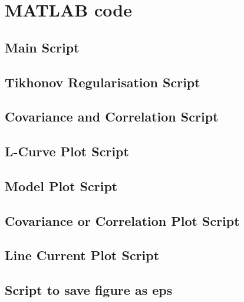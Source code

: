 \appendix
\section{MATLAB code}
\subsection{Main Script}


\clearpage
\subsection{Tikhonov Regularisation Script}


\subsection{Covariance and Correlation Script}


\subsection{L-Curve Plot Script}


\subsection{Model Plot Script}


\subsection{Covariance or Correlation Plot Script}


\clearpage
\subsection{Line Current Plot Script}


\subsection{Script to save figure as eps}

